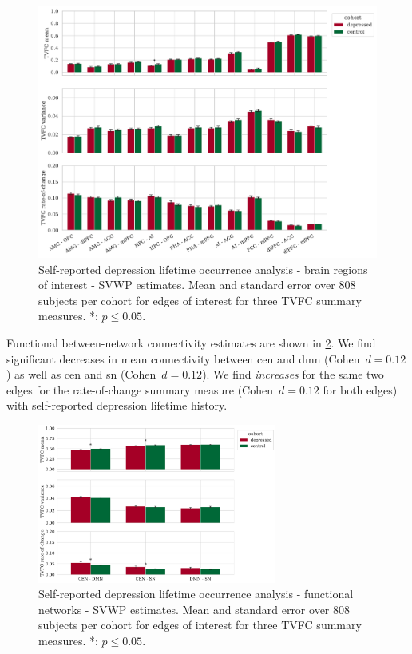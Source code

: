 \begin{figure}[h]
  \centering
  \includegraphics[width=\textwidth]{fig/ukbiobank/TVFC_predictions_summaries/lifetime_occurrence/cohort_comparison/ROI/correlation_all_TVFC_summary_measures_SVWP_joint_edges_of_interest}
  \caption{
    Self-reported depression lifetime occurrence analysis - brain regions of interest - SVWP estimates.
    Mean and standard error over 808 subjects per cohort for edges of interest for three TVFC summary measures.
    *: $p \leq 0.05$.
  }
  \label{fig:ukb-results-lo-roi-cohort-comparison-edges-of-interest-wp}
\end{figure}


Functional between-network connectivity estimates are shown in \cref{fig:ukb-results-lo-fn-cohort-comparison-edges-of-interest-wp}.
We find significant decreases in mean connectivity between \gls{cen} and \gls{dmn} (Cohen~$d = 0.12$) as well as \gls{cen} and \gls{sn} (Cohen~$d = 0.12$).
We find \emph{increases} for the same two edges for the rate-of-change summary measure (Cohen~$d = 0.12$ for both edges) with self-reported depression lifetime history.


\begin{figure}[h]
  \centering
  \includegraphics[width=0.7\textwidth]{fig/ukbiobank/TVFC_predictions_summaries/lifetime_occurrence/cohort_comparison/FN/correlation_all_TVFC_summary_measures_SVWP_joint_edges_of_interest}
  \caption{
    Self-reported depression lifetime occurrence analysis - functional networks - SVWP estimates.
    Mean and standard error over 808 subjects per cohort for edges of interest for three TVFC summary measures.
    *: $p \leq 0.05$.
  }
  \label{fig:ukb-results-lo-fn-cohort-comparison-edges-of-interest-wp}
\end{figure}


